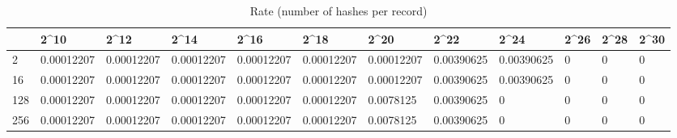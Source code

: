 \begin{table}
\caption{Rate (number of hashes per record)}
\label{tab:rate}
\begin{tabular}{llllllllllll}
\toprule
 & 2^{10} & 2^{12} & 2^{14} & 2^{16} & 2^{18} & 2^{20} & 2^{22} & 2^{24} & 2^{26} & 2^{28} & 2^{30} \\
\midrule
2 & 0.00012207 & 0.00012207 & 0.00012207 & 0.00012207 & 0.00012207 & 0.00012207 & 0.00390625 & 0.00390625 & 0 & 0 & 0 \\
16 & 0.00012207 & 0.00012207 & 0.00012207 & 0.00012207 & 0.00012207 & 0.00012207 & 0.00390625 & 0.00390625 & 0 & 0 & 0 \\
128 & 0.00012207 & 0.00012207 & 0.00012207 & 0.00012207 & 0.00012207 & 0.0078125 & 0.00390625 & 0 & 0 & 0 & 0 \\
256 & 0.00012207 & 0.00012207 & 0.00012207 & 0.00012207 & 0.00012207 & 0.0078125 & 0.00390625 & 0 & 0 & 0 & 0 \\
\bottomrule
\end{tabular}
\end{table}
